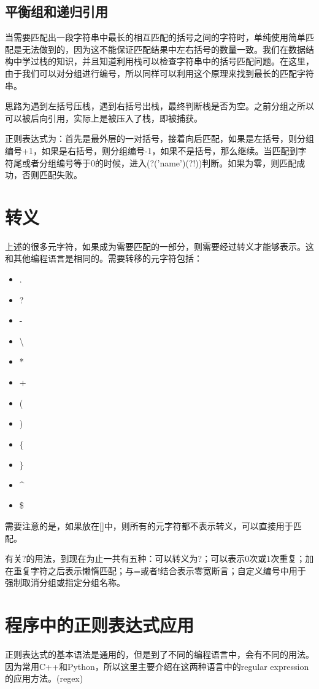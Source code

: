 \documentclass[a4papaer,utf8,12pt,draft,titlepage]{ctexart}
\begin{document}
			\subsection{平衡组和递归引用}
				当需要匹配出一段字符串中最长的相互匹配的括号之间的字符时，单纯使用简单匹配是无法做到的，因为这不能保证匹配结果中左右括号的数量一致。我们在数据结构中学过栈的知识，并且知道利用栈可以检查字符串中的括号匹配问题。在这里，由于我们可以对分组进行编号，所以同样可以利用这个原理来找到最长的匹配字符串。
				
				思路为遇到左括号压栈，遇到右括号出栈，最终判断栈是否为空。之前分组之所以可以被后向引用，实际上是被压入了栈，即被捕获。
				
				正则表达式为：首先是最外层的一对括号，接着向后匹配，如果是左括号，则分组编号+1，如果是右括号，则分组编号-1，如果不是括号，那么继续。当匹配到字符尾或者分组编号等于0的时候，进入(?('name')(?!))判断。如果为零，则匹配成功，否则匹配失败。
		\section{转义}
			上述的很多元字符，如果成为需要匹配的一部分，则需要经过转义才能够表示。这和其他编程语言是相同的。需要转移的元字符包括：
			
			\begin{itemize}
				\item {.} 
				\item{?}
				\item{-}
				\item{\textbackslash}
				\item{*}
				\item{+}
				\item{(}
				\item{)}
				\item{$\lbrace$}
				\item{$\rbrace$}
				\item \^
				\item \$
			\end{itemize}
			需要注意的是，如果放在[]中，则所有的元字符都不表示转义，可以直接用于匹配。
			
			有关?的用法，到现在为止一共有五种：可以转义为?；可以表示0次或1次重复；加在重复字符之后表示懒惰匹配；与=或者!结合表示零宽断言；自定义编号中用于强制取消分组或指定分组名称。
		
		\section{程序中的正则表达式应用}
			正则表达式的基本语法是通用的，但是到了不同的编程语言中，会有不同的用法。因为常用C++和Python，所以这里主要介绍在这两种语言中的regular expression的应用方法。(regex)
\end{document}

